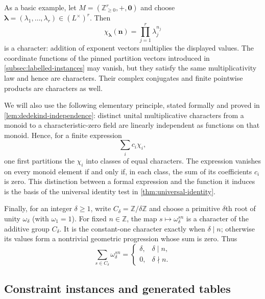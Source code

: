 \documentclass[11pt]{article}
\theoremstyle{plain}
\theoremstyle{definition}
\theoremstyle{remark}
\begin{document}
As a basic example, let $M=(\mathbb Z_{\ge0}^r,+,\mathbf 0)$ and choose
$\boldsymbol\lambda=(\lambda_1,\ldots,\lambda_r)\in(L^\times)^r$.  Then
\begin{equation*}
  \chi_{\boldsymbol\lambda}(\mathbf n)
  =\prod_{j=1}^r\lambda_j^{n_j}
\end{equation*}
is a character: addition of exponent vectors multiplies the displayed
values.  The coordinate functions of the pinned partition vectors introduced
in \cref{subsec:labelled-instances} may vanish, but they satisfy the same
multiplicativity law and hence are characters.  Their complex conjugates and
finite pointwise products are characters as well.

We will also use the following elementary principle, stated formally and
proved in \cref{lem:dedekind-independence}: distinct unital multiplicative
characters from a monoid to a characteristic-zero field are linearly
independent as functions on that monoid.  Hence, for a finite expression
\[
  \sum_i c_i\chi_i,
\]
one first partitions the $\chi_i$ into classes of equal characters.  The
expression vanishes on every monoid element if and only if, in each class,
the sum of its coefficients $c_i$ is zero.  This distinction between a
formal expression and the function it induces is the basis of the universal
identity test in \cref{thm:universal-identity}.

Finally, for an integer $\delta\ge1$, write
$C_\delta=\mathbb Z/\delta\mathbb Z$ and choose a primitive
$\delta$th root of unity $\omega_\delta$ (with $\omega_1=1$).  For fixed
$n\in\mathbb Z$, the map $s\mapsto\omega_\delta^{sn}$ is a character of the
additive group $C_\delta$.  It is the constant-one character exactly when
$\delta\mid n$; otherwise its values form a nontrivial geometric progression
whose sum is zero.  Thus
\begin{equation}
  \sum_{s\in C_\delta}\omega_\delta^{sn}
  =
  \begin{cases}
    \delta,&\delta\mid n,\\
    0,&\delta\nmid n.
  \end{cases}
  \label{eq:cyclic-character-filter}
\end{equation}

\subsection{Constraint instances and generated tables}
\end{document}
